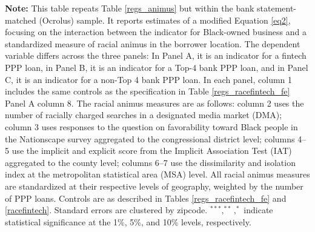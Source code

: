 \documentclass[11pt]{article}
\begin{document}
\newpage
\begin{landscape}
    \begin{table}[H]
        \begin{adjustbox}{width=\linewidth, center}
            
        \end{adjustbox}
        
        \begin{minipage}{\linewidth} \medskip
            \footnotesize{{\bf Note: }This table repeats Table \ref{regs_animus} but within the bank statement-matched (Ocrolus) sample. It reports estimates of a modified Equation \ref{eq2}, focusing on the interaction between the indicator for Black-owned business and a standardized measure of racial animus in the borrower location. The dependent variable differs across the three panels: In Panel A, it is an indicator for a fintech PPP loan, in Panel B, it is an indicator for a Top-4 bank PPP loan, and in Panel C, it is an indicator for a non-Top 4 bank PPP loan. In each panel, column 1 includes the same controls as the specification in Table \ref{regs_racefintech_fe} Panel A column 8. The racial animus measures are as follows: column 2 uses the number of racially charged searches in a designated media market (DMA); column 3 uses responses to the question on favorability toward Black people in the Nationscape survey aggregated to the congressional district level; columns 4--5 use the implicit and explicit score from the Implicit Association Test (IAT) aggregated to the county level; columns 6--7 use the dissimilarity and isolation index at the metropolitan statistical area (MSA) level. All racial animus measures are standardized at their respective levels of geography, weighted by the number of PPP loans.  Controls are as described in Tables \ref{regs_racefintech_fe} and \ref{racefintech}. Standard errors are clustered by zipcode. $^{***}, ^{**}, ^{*}$ indicate statistical significance at the 1\%, 5\%, and 10\% levels, respectively.}
        \end{minipage}
    \end{table}
\end{landscape}

\newpage


\end{document}
